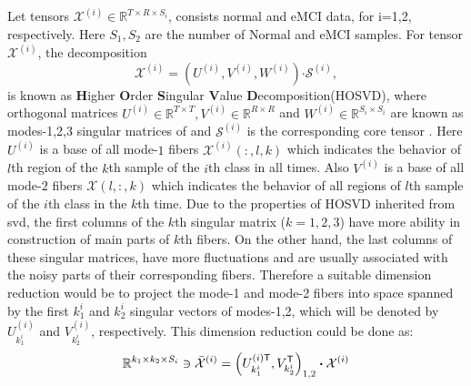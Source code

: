 \documentclass[journal]{IEEEtran}
\begin{document}
	Let tensors $\mathcal{X}^{(i)}\in \mathbb{R}^{T\times R \times S_i}$, consists normal and eMCI data, for i=1,2, respectively.  Here $S_1,S_2$ are the number of Normal and eMCI samples.
	For tensor $\mathcal{X}^{(i)}$, the decomposition
	\begin{equation}
	\label{ho}
	\mathcal{X}^{(i)} = 
	\left(  
	U^{(i)},V^{(i)},W^{(i)}
	\right)\boldsymbol{\cdot} \mathcal{S}^{(i)},
	\end{equation}
	is known as \textbf{H}igher \textbf{O}rder \textbf{S}ingular \textbf{V}alue \textbf{D}ecomposition(HOSVD),
	where orthogonal matrices $U^{(i)}\in \mathbb{R}^{T\times T}, V^{(i)}\in \mathbb{R}^{R\times R} $ and $W^{(i)}\in \mathbb{R}^{S_i\times S_i}$ are known as modes-1,2,3 singular matrices of 
	and $\mathcal{S}^{(i)}$ is the corresponding core tensor \cite{r64}.  Here $U^{(i)}$ is a base of all mode-$ 1 $ fibers $\mathcal{X}^{(i)}(:,l,k)$
	which indicates the behavior of $l$th region of the $k$th sample of the $i$th class in all times. Also  $V^{(i)}$ is a base of all mode-$ 2 $ fibers $\mathcal{X}(l,:,k)$ which indicates the behavior of all regions of  $l$th  sample of the $i$th class in  the $k$th time.
	Due to the properties of HOSVD inherited from svd, the first columns of the $k$th singular matrix ($k = 1,2,3$) have more ability in construction of main parts of $k$th fibers. On the other hand, the last columns of these singular matrices, have more fluctuations and are usually associated with the noisy parts of their corresponding fibers\cite{r64}. 
	Therefore a suitable dimension reduction would be to project the mode-1 and mode-2 fibers into space spanned by the first $k^i_1$ and $k^i_2$ singular vectors of modes-1,2, which will be denoted by $U^{(i)}_{k^i_1}$ and $V_{k^i_2}^{(i)}$, respectively. This dimension reduction could be done as:
	\begin{align}
	\label{m1}
	\mathbb{R}^{k_1 \times k_2 \times S_i} \ni  \bar{{\mathcal{X}}}^{(i)} = \left( 
	U^{(i) {\sf {T}}}_{k^i_1}, V_{k^i_2}^{\sf {T}}
	\right)_{1,2}\boldsymbol{\cdot} \mathcal{X}^{(i)}
	\end{align}
\end{document}
